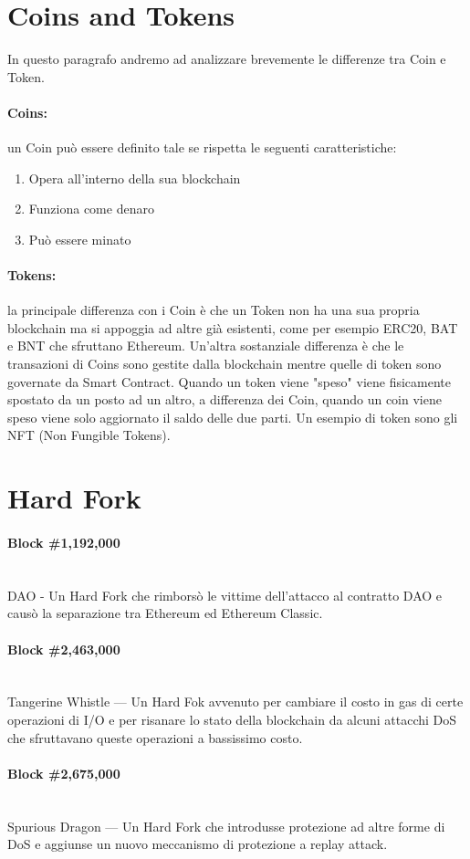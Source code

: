 \section{Coins and Tokens}
In questo paragrafo andremo ad analizzare brevemente le differenze tra Coin e Token.

\paragraph{Coins:}
un Coin può essere definito tale se rispetta le seguenti caratteristiche:

\begin{enumerate}
      \item Opera all'interno della sua blockchain
      \item Funziona come denaro
      \item Può essere minato
\end{enumerate}

\paragraph{Tokens:}
la principale differenza con i Coin è che un Token non ha una sua propria blockchain
ma si appoggia ad altre già esistenti, come per esempio ERC20, BAT e BNT che
sfruttano Ethereum. Un'altra sostanziale differenza è che le transazioni di Coins
sono gestite dalla blockchain mentre quelle di token sono governate da Smart Contract.
Quando un token viene "speso" viene fisicamente spostato da un posto ad un altro,
a differenza dei Coin, quando un coin viene speso viene solo aggiornato il saldo
delle due parti. Un esempio di token sono gli NFT (Non Fungible Tokens).

\section{Hard Fork}

\paragraph{Block \#1,192,000} \ \\
DAO - Un Hard Fork che rimborsò le vittime dell'attacco al contratto DAO e causò
la separazione tra Ethereum ed Ethereum Classic.

\paragraph{Block \#2,463,000} \ \\
Tangerine Whistle — Un Hard Fok avvenuto per cambiare il costo in gas di certe
operazioni di I/O e per risanare lo stato della blockchain da alcuni attacchi
DoS che sfruttavano queste operazioni a bassissimo costo.

\paragraph{Block \#2,675,000} \ \\
Spurious Dragon — Un Hard Fork che introdusse protezione ad altre forme di DoS
e aggiunse un nuovo meccanismo di protezione a replay attack.